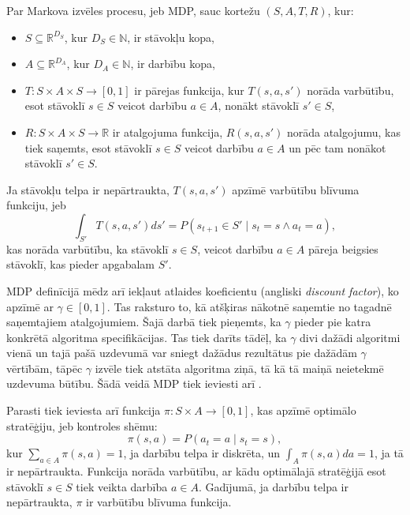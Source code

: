 \documentclass{ludis} %
\begin{document}
\begin{definicija}
Par Markova izvēles procesu, jeb MDP, sauc kortežu $(S, A, T, R)$, kur:
\begin{itemize}
	\item $S \subseteq \mathbb{R}^{D_S}$, kur $D_S \in \mathbb{N}$, ir stāvokļu
    kopa, %
	\item $A \subseteq \mathbb{R}^{D_A}$, kur $D_A \in \mathbb{N}$, ir darbību
    kopa, %
	\item $T:S \times A \times S \rightarrow [0,1]$ ir pārejas funkcija, kur $T(s,
    a, s')$ norāda varbūtību, esot stāvoklī $s \in S$ veicot darbību $a \in A$,
    nonākt stāvoklī $s' \in S$,
	\item $R:S \times A \times S \rightarrow \mathbb{R}$ ir atalgojuma funkcija,
    $R(s, a, s')$ norāda atalgojumu, kas tiek saņemts, esot stāvoklī $s \in S$
    veicot darbību $a \in A$ un pēc tam nonākot stāvoklī $s' \in S$.
\end{itemize}
Ja stāvokļu telpa ir nepārtraukta, $T(s, a, s')$ apzīmē varbūtību blīvuma
funkciju, jeb
\[
	\int_{S'} T(s, a, s')ds' = P(s_{t+1} \in S' \mid s_t = s \land a_t = a),
\]
kas norāda varbūtību, ka stāvoklī $s \in S$, veicot darbību $a \in A$ pāreja
beigsies stāvoklī, kas pieder apgabalam $S'$. %
\end{definicija}

MDP definīcijā mēdz arī iekļaut atlaides koeficientu (angliski \textit{discount
  factor}), ko apzīmē ar $\gamma \in [0,1]$. Tas raksturo to, kā atšķiras
nākotnē saņemtie no tagadnē saņemtajiem atalgojumiem. Šajā darbā tiek pieņemts,
ka $\gamma$ pieder pie katra konkrētā algoritma specifikācijas. %
Tas tiek darīts tādēļ, ka $\gamma$ divi dažādi algoritmi vienā un tajā pašā
uzdevumā var sniegt dažādus rezultātus pie dažādām $\gamma$ vērtībām, %
tāpēc $\gamma$ izvēle tiek atstāta algoritma ziņā, tā kā tā maiņā neietekmē
uzdevuma būtību. %
Šādā veidā MDP tiek ieviesti arī \autocite{Otterlo}.

Parasti tiek ieviesta arī funkcija $\pi: S \times A \rightarrow [0, 1]$, kas
apzīmē optimālo stratēģiju, jeb kontroles shēmu:
\[
	\pi(s, a) = P(a_t = a \mid s_t = s),
\]
kur $\sum_{a\in A} \pi(s,a)=1$, ja darbību telpa ir diskrēta, un $\int_{A}
\pi(s,a) da = 1$, ja tā ir nepārtraukta. Funkcija norāda varbūtību, ar kādu
optimālajā stratēģijā esot stāvoklī $s \in S$ tiek veikta darbība $a \in A$.
Gadījumā, ja darbību telpa ir nepārtraukta, $\pi$ ir varbūtību blīvuma funkcija.
\end{document}
